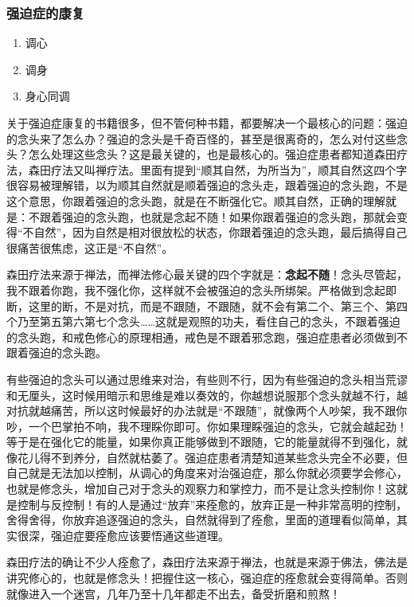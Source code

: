 \subsubsection{强迫症的康复}

\begin{enumerate}
    \item 调心
    \item 调身
    \item 身心同调
\end{enumerate}

关于强迫症康复的书籍很多，但不管何种书籍，都要解决一个最核心的问题：强迫的念头来了怎么办？强迫的念头是千奇百怪的，甚至是很离奇的，怎么对付这些念头？怎么处理这些念头？这是最关键的，也是最核心的。强迫症患者都知道森田疗法，森田疗法又叫禅疗法。里面有提到“顺其自然，为所当为”，顺其自然这四个字很容易被理解错，以为顺其自然就是顺着强迫的念头走，跟着强迫的念头跑，不是这个意思，你跟着强迫的念头跑，就是在不断强化它。顺其自然，正确的理解就是：不跟着强迫的念头跑，也就是念起不随！如果你跟着强迫的念头跑，那就会变得“不自然”，因为自然是相对很放松的状态，你跟着强迫的念头跑，最后搞得自己很痛苦很焦虑，这正是“不自然”。

森田疗法来源于禅法，而禅法修心最关键的四个字就是：\textbf{念起不随}！念头尽管起，我不跟着你跑，我不强化你，这样就不会被强迫的念头所绑架。严格做到念起即断，这里的断，不是对抗，而是不跟随，不跟随，就不会有第二个、第三个、第四个乃至第五第六第七个念头……这就是观照的功夫，看住自己的念头，不跟着强迫的念头跑，和戒色修心的原理相通，戒色是不跟着邪念跑，强迫症患者必须做到不跟着强迫的念头跑。

有些强迫的念头可以通过思维来对治，有些则不行，因为有些强迫的念头相当荒谬和无厘头，这时候用暗示和思维是难以奏效的，你越想说服那个念头就越不行，越对抗就越痛苦，所以这时候最好的办法就是“不跟随”，就像两个人吵架，我不跟你吵，一个巴掌拍不响，我不理睬你即可。你如果理睬强迫的念头，它就会越起劲！等于是在强化它的能量，如果你真正能够做到不跟随，它的能量就得不到强化，就像花儿得不到养分，自然就枯萎了。强迫症患者清楚知道某些念头完全不必要，但自己就是无法加以控制，从调心的角度来对治强迫症，那么你就必须要学会修心，也就是修念头，增加自己对于念头的观察力和掌控力，而不是让念头控制你！这就是控制与反控制！有的人是通过“放弃”来痊愈的，放弃正是一种非常高明的控制，舍得舍得，你放弃追逐强迫的念头，自然就得到了痊愈，里面的道理看似简单，其实很深，强迫症要痊愈应该要悟通这些道理。

森田疗法的确让不少人痊愈了，森田疗法来源于禅法，也就是来源于佛法，佛法是讲究修心的，也就是修念头！把握住这一核心，强迫症的痊愈就会变得简单。否则就像进入一个迷宫，几年乃至十几年都走不出去，备受折磨和煎熬！

